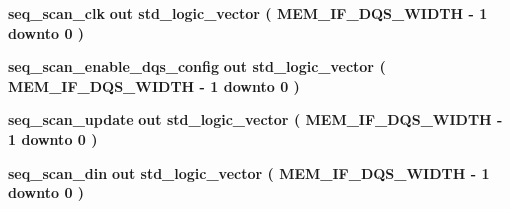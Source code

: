 \begin{DoxyCompactItemize}
\item 
{\bf seq\+\_\+scan\+\_\+clk}  {\bfseries {\bfseries \textcolor{keywordflow}{out}\textcolor{vhdlchar}{ }}} {\bfseries \textcolor{comment}{std\+\_\+logic\+\_\+vector}\textcolor{vhdlchar}{ }\textcolor{vhdlchar}{(}\textcolor{vhdlchar}{ }\textcolor{vhdlchar}{ }\textcolor{vhdlchar}{ }\textcolor{vhdlchar}{ }{\bfseries {\bf M\+E\+M\+\_\+\+I\+F\+\_\+\+D\+Q\+S\+\_\+\+W\+I\+D\+TH}} \textcolor{vhdlchar}{-\/}\textcolor{vhdlchar}{ } \textcolor{vhdldigit}{1} \textcolor{vhdlchar}{ }\textcolor{keywordflow}{downto}\textcolor{vhdlchar}{ }\textcolor{vhdlchar}{ } \textcolor{vhdldigit}{0} \textcolor{vhdlchar}{ }\textcolor{vhdlchar}{)}\textcolor{vhdlchar}{ }} 
\item 
{\bf seq\+\_\+scan\+\_\+enable\+\_\+dqs\+\_\+config}  {\bfseries {\bfseries \textcolor{keywordflow}{out}\textcolor{vhdlchar}{ }}} {\bfseries \textcolor{comment}{std\+\_\+logic\+\_\+vector}\textcolor{vhdlchar}{ }\textcolor{vhdlchar}{(}\textcolor{vhdlchar}{ }\textcolor{vhdlchar}{ }\textcolor{vhdlchar}{ }\textcolor{vhdlchar}{ }{\bfseries {\bf M\+E\+M\+\_\+\+I\+F\+\_\+\+D\+Q\+S\+\_\+\+W\+I\+D\+TH}} \textcolor{vhdlchar}{-\/}\textcolor{vhdlchar}{ } \textcolor{vhdldigit}{1} \textcolor{vhdlchar}{ }\textcolor{keywordflow}{downto}\textcolor{vhdlchar}{ }\textcolor{vhdlchar}{ } \textcolor{vhdldigit}{0} \textcolor{vhdlchar}{ }\textcolor{vhdlchar}{)}\textcolor{vhdlchar}{ }} 
\item 
{\bf seq\+\_\+scan\+\_\+update}  {\bfseries {\bfseries \textcolor{keywordflow}{out}\textcolor{vhdlchar}{ }}} {\bfseries \textcolor{comment}{std\+\_\+logic\+\_\+vector}\textcolor{vhdlchar}{ }\textcolor{vhdlchar}{(}\textcolor{vhdlchar}{ }\textcolor{vhdlchar}{ }\textcolor{vhdlchar}{ }\textcolor{vhdlchar}{ }{\bfseries {\bf M\+E\+M\+\_\+\+I\+F\+\_\+\+D\+Q\+S\+\_\+\+W\+I\+D\+TH}} \textcolor{vhdlchar}{-\/}\textcolor{vhdlchar}{ } \textcolor{vhdldigit}{1} \textcolor{vhdlchar}{ }\textcolor{keywordflow}{downto}\textcolor{vhdlchar}{ }\textcolor{vhdlchar}{ } \textcolor{vhdldigit}{0} \textcolor{vhdlchar}{ }\textcolor{vhdlchar}{)}\textcolor{vhdlchar}{ }} 
\item 
{\bf seq\+\_\+scan\+\_\+din}  {\bfseries {\bfseries \textcolor{keywordflow}{out}\textcolor{vhdlchar}{ }}} {\bfseries \textcolor{comment}{std\+\_\+logic\+\_\+vector}\textcolor{vhdlchar}{ }\textcolor{vhdlchar}{(}\textcolor{vhdlchar}{ }\textcolor{vhdlchar}{ }\textcolor{vhdlchar}{ }\textcolor{vhdlchar}{ }{\bfseries {\bf M\+E\+M\+\_\+\+I\+F\+\_\+\+D\+Q\+S\+\_\+\+W\+I\+D\+TH}} \textcolor{vhdlchar}{-\/}\textcolor{vhdlchar}{ } \textcolor{vhdldigit}{1} \textcolor{vhdlchar}{ }\textcolor{keywordflow}{downto}\textcolor{vhdlchar}{ }\textcolor{vhdlchar}{ } \textcolor{vhdldigit}{0} \textcolor{vhdlchar}{ }\textcolor{vhdlchar}{)}\textcolor{vhdlchar}{ }} 

\end{DoxyCompactItemize}
